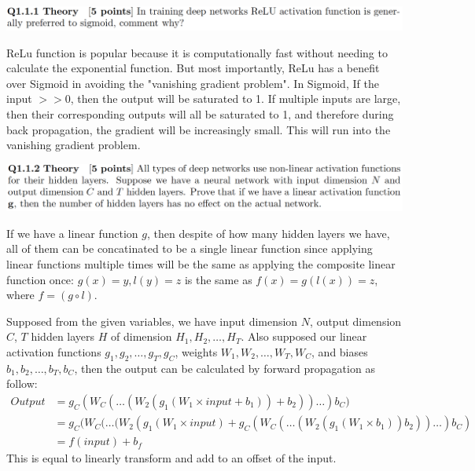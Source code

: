 \documentclass[12pt,letterpaper,boxed]{hmcpset}
\begin{document}

\begin{problem}[]
\includegraphics[width=\textwidth]{1_1_1.png}
\end{problem}

\begin{solution}
ReLu function is popular because it is computationally fast without needing to calculate 
the exponential function. But most importantly, ReLu has a benefit over Sigmoid in avoiding
the "vanishing gradient problem". In Sigmoid, If the input $>> 0$, then the output will be saturated 
to 1. If multiple inputs are large, then their corresponding outputs will all
be saturated to 1, and therefore during back propagation, the gradient will be increasingly small. 
This will run into the vanishing gradient problem.
\end{solution}

\begin{problem}[]
\includegraphics[width=\textwidth]{1_1_2.png}
\end{problem}

\begin{solution}
If we have a linear function $g$, then despite of how many hidden layers we have, all of them 
can be concatinated to be a single linear function since applying linear functions multiple times
will be the same as applying the composite linear function once: $g(x) = y, l(y) = z$ is the same as $
f(x) = g(l(x)) = z$, where $f = (g\circ l)$.

Supposed from the given variables, we have input dimension $N$, output dimension $C$, $T$ hidden layers $H$ of dimension $H_1,H_2, \ldots, H_T$. Also supposed our linear activation functions $g_1, g_2, \ldots, g_T, g_C$, weights $W_1, W_2, \ldots, W_T, W_C$, and biases $b_1, b_2, \ldots, b_T, b_C$, then the output can be calculated by forward propagation as follow:
\begin{align*}
  Output &= g_C(W_C(\ldots(W_2(g_1(W_1\times input+b_1))+b_2))\ldots)b_C)\\
         &= g_C(W_C(\ldots(W_2(g_1(W_1\times input)+ g_C(W_C(\ldots(W_2(g_1(W_1\times b_1))b_2))\ldots)b_C)\\
         &= f(input) + b_f
\end{align*}
This is equal to linearly transform and add to an offset of the input.
\end{solution}
\newpage
\end{document}
